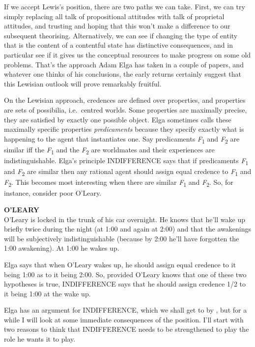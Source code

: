 \documentclass[
  11pt,
  letterpaper,
  DIV=11,
  numbers=noendperiod,
  oneside]{scrartcl}
\begin{document}
If we accept Lewis's position, there are two paths we can take. First,
we can try simply replacing all talk of propositional attitudes with
talk of proprietal attitudes, and trusting and hoping that this won't
make a difference to our subsequent theorising. Alternatively, we can
see if changing the type of entity that is the content of a contentful
state has distinctive consequences, and in particular see if it gives us
the conceptual resources to make progress on some old problems. That's
the approach Adam Elga has taken in a couple of papers, and whatever one
thinks of his conclusions, the early returns certainly suggest that this
Lewisian outlook will prove remarkably fruitful.

On the Lewisian approach, credences are defined over properties, and
properties are sets of possibilia, i.e.~centred worlds. Some properties
are maximally precise, they are satisfied by exactly one possible
object. Elga sometimes calls these maximally specific properties
\emph{predicaments} because they specify exactly what is happening to
the agent that instantiates one. Say predicaments
\emph{F}\textsubscript{1} and \emph{F}\textsubscript{2} are similar iff
the \emph{F}\textsubscript{1} and the \emph{F}\textsubscript{2} are
worldmates and their experiences are indistinguishable. Elga's principle
INDIFFERENCE says that if predicaments \emph{F}\textsubscript{1} and
\emph{F}\textsubscript{2} are similar then any rational agent should
assign equal credence to \emph{F}\textsubscript{1} and
\emph{F}\textsubscript{2}. This becomes most interesting when there are
similar \emph{F}\textsubscript{1} and \emph{F}\textsubscript{2}. So, for
instance, consider poor O'Leary.

\textbf{O'LEARY}\\
O'Leary is locked in the trunk of his car overnight. He knows that he'll
wake up briefly twice during the night (at 1:00 and again at 2:00) and
that the awakenings will be subjectively indistinguishable (because by
2:00 he'll have forgotten the 1:00 awakening). At 1:00 he wakes up.

Elga says that when O'Leary wakes up, he should assign equal credence to
it being 1:00 as to it being 2:00. So, provided O'Leary knows that one
of these two hypotheses is true, INDIFFERENCE says that he should assign
credence 1/2 to it being 1:00 at the wake up.

Elga has an argument for INDIFFERENCE, which we shall get to by , but
for a while I will look at some immediate consequences of the position.
I'll start with two reasons to think that INDIFFERENCE needs to be
strengthened to play the role he wants it to play.
\end{document}
